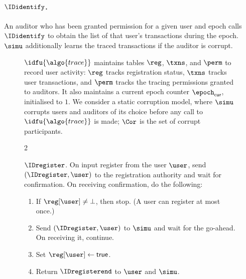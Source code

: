 \paragraph{$\IDidentify$.} An auditor who has been granted permission for a
given user and epoch calls $\IDidentify$ to obtain the list of that user's
transactions during the epoch. $\simu$ additionally learns the traced
transactions if the auditor is corrupt.

\begin{figure} \centering \hspace*{-0.05\textwidth}
  \begin{minipage}{1.1\textwidth}

    \begin{framed} \scriptsize


      $\idfu{\algo{trace}}$ maintains tables $\reg$, $\txns$, and $\perm$ to
      record user activity: $\reg$ tracks registration status, $\txns$ tracks
      user transactions, and $\perm$ tracks the tracing permissions granted to
      auditors. It also maintains a current epoch counter
      $\epoch_{\mathsf{cur}}$, initialised to $1$. We consider a static
      corruption model, where $\simu$ corrupts users and auditors of its choice
      before any call to $\idfu{\algo{trace}}$ is made; $\Cor$ is the set of
      corrupt participants.

      \begin{multicols}{2}

        {$\IDregister$.} On input register from the user $\user$, send
        $(\IDregister, \user)$ to the registration authority and wait for
        confirmation. On receiving confirmation, do the following:

        \begin{enumerate}

          \item If $\reg[\user] \neq \bot$, then stop. (A user can register at
            most once.)

          \item Send $(\IDregister, \user)$ to $\simu$ and wait for the
            go-ahead. On receiving it, continue.

          \item Set $\reg[\user] \leftarrow \mathsf{true}$.

          \item Return $\IDregisterend$ to $\user$ and $\simu$.


\end{enumerate}
\end{multicols}
\end{framed}
\end{minipage}
\end{figure}
